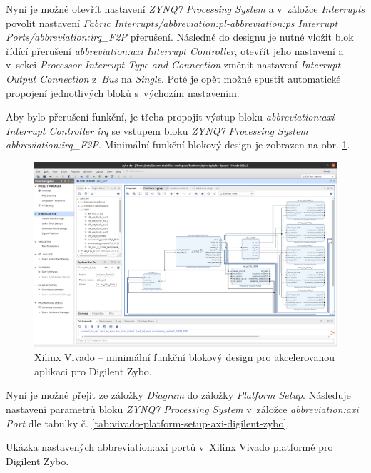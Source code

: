 \documentclass[a4paper, twoside, 11pt]{article}
\begin{document}
\begin{appendices}
		Nyní je možné otevřít nastavení \textit{ZYNQ7 Processing System} a v~záložce \textit{Interrupts} povolit nastavení \textit{Fabric Interrupts/\gls{abbreviation:pl}-\gls{abbreviation:ps} Interrupt Ports/\gls{abbreviation:irq}\_F2P} přerušení. Následně do designu je nutné vložit blok řídící přerušení \textit{\gls{abbreviation:axi} Interrupt Controller}, otevřít jeho nastavení a v~sekci \textit{Processor Interrupt Type and Connection} změnit nastavení \textit{Interrupt Output Connection} z~\textit{Bus} na \textit{Single}. Poté je opět možné spustit automatické propojení jednotlivých bloků s~výchozím nastavením.\par
		Aby bylo přerušení funkční, je třeba propojit výstup bloku \textit{\gls{abbreviation:axi} Interrupt Controller} \textit{irq} se vstupem bloku \textit{ZYNQ7 Processing System} \textit{\gls{abbreviation:irq}\_F2P}. Minimální funkční blokový design je zobrazen na obr. \ref{fig:zybo-xilinx-vivado-flow-17}.

		\begin{figure}[htbp!]
			\centering
			\includegraphics[width=1\textwidth]{src/png/zybo-xilinx-vivado-flow/zybo-xilinx-vivado-flow-17.jpg}
			\caption{Xilinx Vivado – minimální funkční blokový design pro akcelerovanou aplikaci pro Digilent Zybo.}
			\label{fig:zybo-xilinx-vivado-flow-17}
		\end{figure}

		Nyní je možné přejít ze záložky \textit{Diagram} do záložky \textit{Platform Setup}. Následuje nastavení parametrů bloku \textit{ZYNQ7 Processing System} v~záložce \textit{\gls{abbreviation:axi} Port} dle tabulky č. \ref{tab:vivado-platform-setup-axi-digilent-zybo}.


		\begin{table}[H]
			\centering
			\caption{Ukázka nastavených \gls{abbreviation:axi} portů v~Xilinx Vivado platformě pro Digilent Zybo.}
		  \vspace*{0.15cm}
		

\end{table}
\end{appendices}
\end{document}
